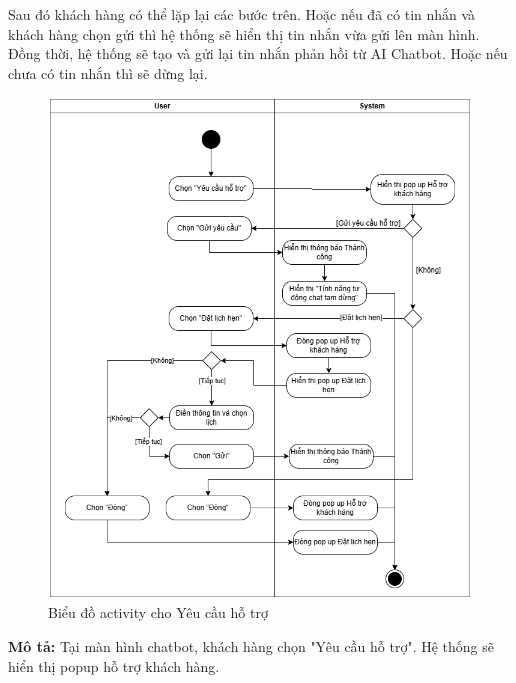 Sau đó khách hàng có thể lặp lại các bước trên. Hoặc nếu đã có tin nhắn và khách hàng chọn gửi thì hệ thống sẽ hiển thị tin nhắn vừa gửi lên màn hình. Đồng thời, hệ thống sẽ tạo và gửi lại tin nhắn phản hồi từ AI Chatbot. Hoặc nếu chưa có tin nhắn thì sẽ dừng lại.
\begin{figure}[H]
    \centering
    \includegraphics[width=1\textwidth]{Dg_Activity/NeedSupport.png}
    \vspace{0.5cm}
    \caption{Biểu đồ activity cho Yêu cầu hỗ trợ}
    \label{fig:enter-label}
\end{figure}
\textbf{Mô tả:}
Tại màn hình chatbot, khách hàng chọn "Yêu cầu hỗ trợ". Hệ thống sẽ hiển thị popup hỗ trợ khách hàng.
